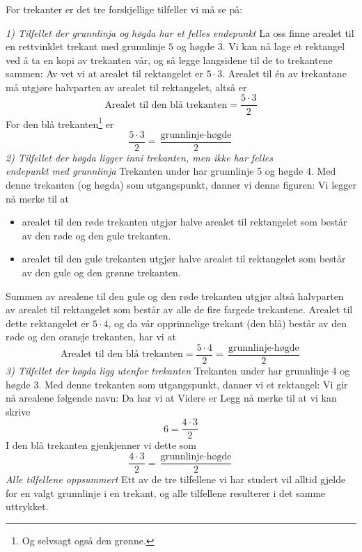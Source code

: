 \subsubsection{\artri \label{artri}}
For trekanter er det tre forskjellige tilfeller vi må se på: \vsk

\textit{1) Tilfellet der grunnlinja og høgda har et felles endepunkt} \os
La oss finne arealet til en rettvinklet trekant med grunnlinje $ 5 $ og høgde $ 3 $.
Vi kan nå lage et rektangel ved å ta en kopi av trekanten vår, og så legge langsidene til de to trekantene sammen:
Av  vet vi at arealet til rektangelet er $ {5\cdot 3} $. Arealet til én av trekantane må utgjøre halvparten av arealet til rektangelet, altså er
\[ \text{Arealet til den blå trekanten} = \frac{5\cdot 3}{2} \]
For den blå trekanten\footnote{Og selvsagt også den grønne.} er 
\[\frac{5\cdot3}{2}= \frac{\text{grunnlinje}\cdot\text{høgde}}{2} \]
\newpage
\textit{2) Tilfellet der høgda ligger inni trekanten, men ikke har felles\\ endepunkt med grunnlinja} \os
Trekanten under har grunnlinje 5 og høgde 4.
Med denne trekanten (og høgda) som utgangspunkt, danner vi denne figuren:
Vi legger nå merke til at
\begin{itemize}
	\item arealet til den røde trekanten utgjør halve arealet til rektangelet som består av den røde og den gule trekanten.
	\item arealet til den gule trekanten utgjør halve arealet til rektangelet som består av den gule og den grønne trekanten.
\end{itemize}
Summen av arealene til den gule og den røde trekanten utgjør altså halvparten av arealet til rektangelet som består av alle de fire fargede trekantene. Arealet til dette rektangelet er $ 5\cdot4 $, og da vår opprinnelige trekant (den blå) består av den røde og den oransje trekanten, har vi at
\[ \text{Arealet til den blå trekanten}=\frac{5\cdot4}{2}=\frac{\text{grunnlinje}\cdot\text{høgde}}{2} \] 
\newpage
\textit{3) Tilfellet der høgda ligg utenfor trekanten} \os
Trekanten under har grunnlinje 4 og høgde 3. 
Med denne trekanten som utgangspunkt, danner vi et rektangel:
Vi gir nå arealene følgende navn:
Da har vi at
Videre er
Legg nå merke til at vi kan skrive
\[ 6=\frac{4\cdot3}{2} \]
I den blå trekanten gjenkjenner vi dette som 
\[ \frac{4\cdot3}{2}=\frac{\text{grunnlinje}\cdot\text{høgde}}{2} \]
\newpage
\textit{Alle tilfellene oppsummert}\os
Ett av de tre tilfellene vi har studert vil alltid  gjelde for en valgt grunnlinje i en trekant, og alle tilfellene resulterer i det samme uttrykket.\regv

